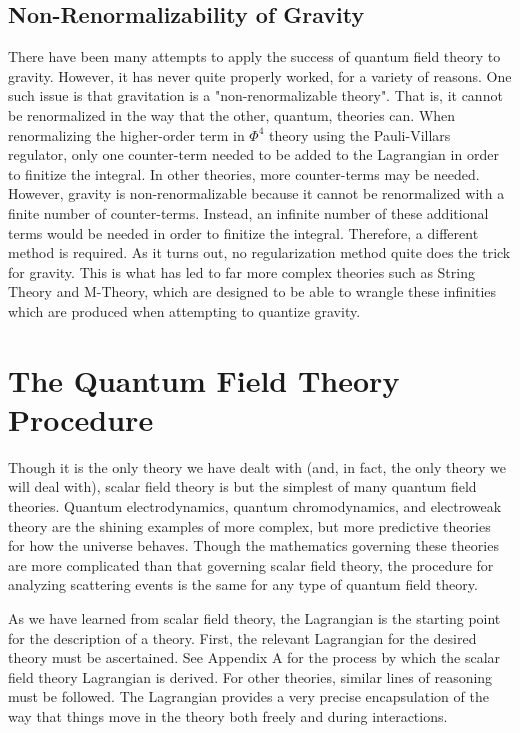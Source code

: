 \documentclass{report}
\begin{document}
\section{Non-Renormalizability of Gravity}
There have been many attempts to apply the success of quantum field theory to gravity. However, it has never quite properly worked, for a variety of reasons. One such issue is that gravitation is a "non-renormalizable theory". That is, it cannot be renormalized in the way that the other, quantum, theories can. When renormalizing the higher-order term in $\Phi^4$ theory using the Pauli-Villars regulator, only one counter-term needed to be added to the Lagrangian in order to finitize the integral. In other theories, more counter-terms may be needed. However, gravity is non-renormalizable because it cannot be renormalized with a finite number of counter-terms. Instead, an infinite number of these additional terms would be needed in order to finitize the integral. Therefore, a different method is required. As it turns out, no regularization method quite does the trick for gravity. This is what has led to far more complex theories such as String Theory and M-Theory, which are designed to be able to wrangle these infinities which are produced when attempting to quantize gravity.

\chapter{The Quantum Field Theory Procedure}
Though it is the only theory we have dealt with (and, in fact, the only theory we will deal with), scalar field theory is but the simplest of many quantum field theories. Quantum electrodynamics, quantum chromodynamics, and electroweak theory are the shining examples of more complex, but more predictive theories for how the universe behaves. Though the mathematics governing these theories are more complicated than that governing scalar field theory, the procedure for analyzing scattering events is the same for any type of quantum field theory.

As we have learned from scalar field theory, the Lagrangian is the starting point for the description of a theory. First, the relevant Lagrangian for the desired theory must be ascertained. See Appendix A for the process by which the scalar field theory Lagrangian is derived. For other theories, similar lines of reasoning must be followed. The Lagrangian provides a very precise encapsulation of the way that things move in the theory both freely and during interactions.
\end{document}

